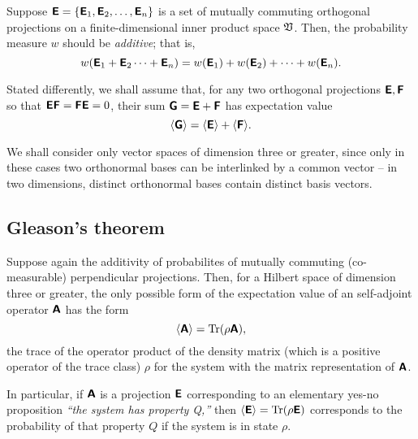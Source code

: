 Suppose
 $\textsf{\textbf{E}}
=
\{
\textsf{\textbf{E}}_1,
\textsf{\textbf{E}}_2,
\ldots ,
\textsf{\textbf{E}}_n
\}
$
is a set of mutually commuting orthogonal projections
on a finite-dimensional inner product space   ${\frak V}$.
Then, the probability measure $w$ should be {\em additive}; that is,
\begin{equation}
w(\textsf{\textbf{E}}_1+\textsf{\textbf{E}}_2\cdots +\textsf{\textbf{E}}_n)=
w(\textsf{\textbf{E}}_1)+
w(\textsf{\textbf{E}}_2)+
\cdots +
w(\textsf{\textbf{E}}_n).
\end{equation}

Stated differently, we shall assume that,
for any two orthogonal projections $ \textsf{\textbf{E}},\textsf{\textbf{F}}$
so that
 $ \textsf{\textbf{E}}\textsf{\textbf{F}}= \textsf{\textbf{F}}\textsf{\textbf{E}}=0$,
their sum
 $  \textsf{\textbf{G}} =\textsf{\textbf{E}}+\textsf{\textbf{F}}$
has expectation value
\begin{equation}
\langle \textsf{\textbf{G}}\rangle =
\langle \textsf{\textbf{E}} \rangle +
\langle \textsf{\textbf{F}} \rangle.
\end{equation}

We shall consider only vector spaces of dimension three or greater, since only in these cases two  orthonormal bases can be interlinked by a common vector -- in two dimensions,
distinct orthonormal bases contain distinct basis vectors.

\subsection{Gleason's theorem}
\label{Gleasontheorem}
Suppose again the additivity of probabilites of mutually commuting (co-measurable) perpendicular projections.
Then, for a Hilbert space of dimension three or greater,
the only possible form of the  expectation value
of an self-adjoint operator  $\textsf{\textbf{A}}$
has the form
\cite{Gleason,r:dvur-93,pitowsky:218,rich-bridge,peres,hamhalter-book}
\begin{equation}
\langle
\textsf{\textbf{A}}
\rangle
=
\textrm{Tr}({  \rho} \textsf{\textbf{A}}),
\end{equation}
the trace of the operator product of the  density matrix (which is a positive operator of the trace class)
${  \rho}$
for the system with the matrix representation of $\textsf{\textbf{A}}$.

In particular, if $\textsf{\textbf{A}}$ is a projection $\textsf{\textbf{E}}$ corresponding to an elementary yes-no proposition
{\it ``the system has property Q,''} then $\langle \textsf{\textbf{E}}\rangle = \textrm{Tr}({  \rho}  \textsf{\textbf{E}})$ corresponds
to the probability of that property $Q$ if the system is in state ${  \rho}$.




